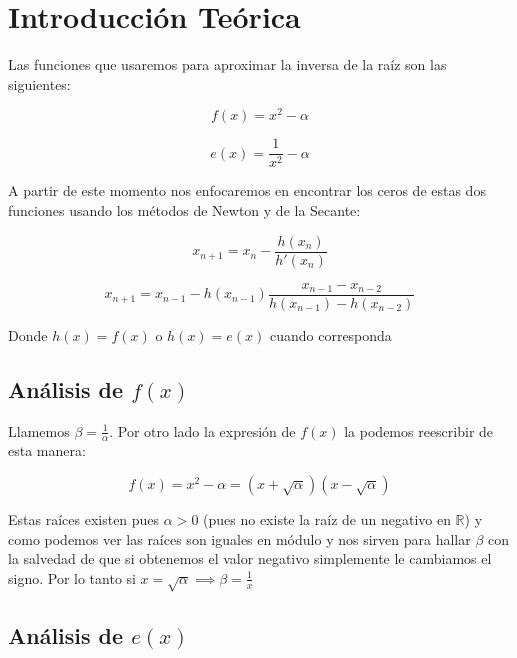 \section{Introducción Teórica}

Las funciones que usaremos para aproximar la inversa de la raíz son las siguientes:

\begin{displaymath}
    f(x) = x^2 - \alpha
\end{displaymath}

\begin{displaymath}
    e(x) = \frac{1}{x^2} - \alpha
\end{displaymath}

A partir de este momento nos enfocaremos en encontrar los ceros de estas dos funciones usando los métodos de Newton y de la Secante:

\begin{displaymath}
    x_{n + 1} = x_n - \frac{h(x_n)}{h'(x_n)}
\end{displaymath}

\begin{displaymath}
    x_{n + 1} = x_{n - 1} - h(x_{n - 1})\frac{x_{n - 1} - x_{n - 2}}{h(x_{n - 1}) - h(x_{n - 2})}
\end{displaymath}

Donde $h(x) = f(x)$ o $h(x) = e(x)$ cuando corresponda 

\subsection{Análisis de $f(x)$}

Llamemos $\displaystyle \beta = \frac{1}{\alpha}$. Por otro lado la expresión de $f(x)$ la podemos reescribir de esta manera:

\begin{displaymath}
    f(x) = x^2 - \alpha = (x + \sqrt{\alpha})(x - \sqrt{\alpha})
\end{displaymath}

Estas raíces existen pues $\alpha > 0$ (pues no existe la raíz de un negativo en $\mathbb{R}$) y como podemos ver las raíces son iguales en módulo y nos sirven para hallar $\beta$ con la salvedad de que si obtenemos el valor negativo simplemente le cambiamos el signo. Por lo tanto si $\displaystyle x = \sqrt{\alpha} \implies \beta = \frac{1}{x}$

\subsection{Análisis de $e(x)$}

